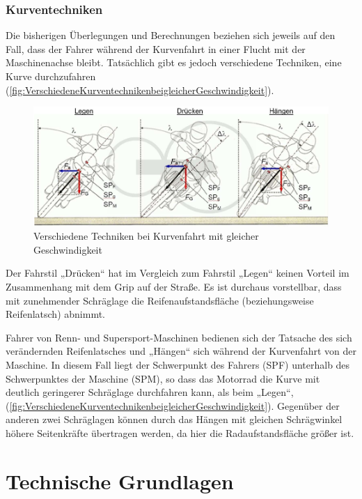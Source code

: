 \subsubsection{Kurventechniken}
Die bisherigen Überlegungen und Berechnungen beziehen sich jeweils auf den Fall, dass der Fahrer während der Kurvenfahrt in einer Flucht mit der Maschinenachse bleibt. Tatsächlich gibt es jedoch verschiedene Techniken, eine Kurve durchzufahren (\autoref{fig:VerschiedeneKurventechnikenbeigleicherGeschwindigkeit}).
\begin{figure}
	\centering
	\includegraphics[width=\linewidth]{Bilder/VerschiedeneKurventechnikenbeigleicherGeschwindigkeit_pdf.pdf}
	\caption{Verschiedene Techniken bei Kurvenfahrt mit gleicher Geschwindigkeit \citep{Haedrich2012}}
	\label{fig:VerschiedeneKurventechnikenbeigleicherGeschwindigkeit}
\end{figure}

Der Fahrstil „Drücken“ hat im Vergleich zum Fahrstil „Legen“ keinen Vorteil im Zusammenhang mit dem Grip auf der Straße. Es ist durchaus vorstellbar, dass mit zunehmender Schräglage die Reifenaufstandsfläche (beziehungsweise Reifenlatsch) abnimmt.

Fahrer von Renn- und Supersport-Maschinen bedienen sich der Tatsache des sich verändernden Reifenlatsches und „Hängen“ sich während der Kurvenfahrt von der Maschine. In diesem Fall liegt der Schwerpunkt des Fahrers (SPF) unterhalb des Schwerpunktes der Maschine (SPM), so dass das Motorrad die Kurve mit deutlich geringerer Schräglage durchfahren kann, als beim „Legen“, (\autoref{fig:VerschiedeneKurventechnikenbeigleicherGeschwindigkeit}). Gegenüber der anderen zwei Schräglagen können durch das \glqq Hängen\grqq{} mit gleichen Schrägwinkel höhere Seitenkräfte übertragen werden, da hier die Radaufstandsfläche größer ist.


%
%
%
%
\section{Technische Grundlagen} \label{Technik}




